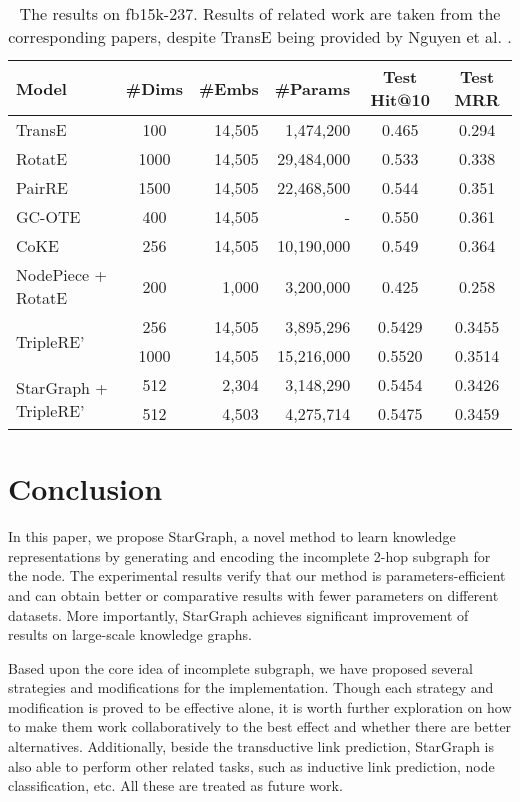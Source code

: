 \documentclass{article}
\begin{document}
\begin{table}
 \caption{The results on fb15k-237. Results of related work are taken from the corresponding papers, despite TransE being provided by Nguyen et al. \cite{dai2018novel}.}
 \centering
 \begin{tabular}{lcrrcc}
 \toprule
Model & \#Dims & \#Embs & \#Params & Test Hit@10 & Test MRR \\
 \midrule
 TransE & 100 & 14,505 & 1,474,200 & 0.465 & 0.294\\
 RotatE & 1000 & 14,505 & 29,484,000 & 0.533 & 0.338\\
 PairRE & 1500 & 14,505 & 22,468,500 & 0.544 & 0.351\\
 GC-OTE & 400 & 14,505 & - & 0.550 & 0.361\\
 CoKE & 256 & 14,505 &  10,190,000 & 0.549 & 0.364\\
 NodePiece + RotatE & 200 & 1,000 &  3,200,000 & 0.425 & 0.258\\
 \midrule
 \multirow{2}{*}{TripleRE'} & 256 & 14,505 & \cellcolor{gray!30} 3,895,296 & 0.5429 & 0.3455\\
 & 1000 & 14,505 & 15,216,000 & 0.5520 & 0.3514\\
 \midrule
 \multirow{2}{*}{StarGraph + TripleRE'} & 512 & 2,304 & \cellcolor{gray!30}3,148,290 & 0.5454 & 0.3426 \\
 & 512 & 4,503 & 4,275,714 & 0.5475 & 0.3459 \\
 \bottomrule
 \end{tabular}
 \label{tab:fb}
\end{table}



\section{Conclusion}
In this paper, we propose StarGraph, a novel method to learn knowledge representations by generating and encoding the incomplete 2-hop subgraph for the node. The experimental results verify that our method is parameters-efficient and can obtain better or comparative results with fewer parameters on different datasets. More importantly, StarGraph achieves significant improvement of results on large-scale knowledge graphs.

Based upon the core idea of incomplete subgraph, we have proposed several strategies and modifications for the implementation. Though each strategy and modification is proved to be effective alone, it is worth further exploration on how to make them work collaboratively to the best effect and whether there are better alternatives.
Additionally, beside the transductive link prediction, StarGraph is also able to perform other related tasks, such as inductive link prediction, node classification, etc. All these are treated as future work.
\end{document}
